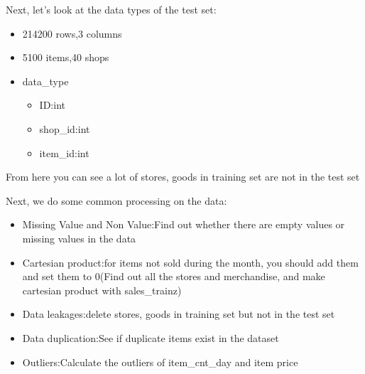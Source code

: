 \documentclass{amsart}
\begin{document}
  Next, let's look at the data types of the test set:
  \begin{itemize}
    \item 214200 rows,3 columns
    \item 5100 items,40 shops
    \item data_type
          \begin{itemize}
            \item ID:int
            \item shop_id:int
            \item item_id:int
          \end{itemize}
  \end{itemize}
  From here you can see a lot of stores, goods in training set are not in the test set\par
  Next, we do some common processing on the data:\par
  \begin{itemize}
      \item Missing Value and Non Value:Find out whether there are empty values or missing values in the data
      \item Cartesian product:for items not sold during the month, you should add them and set them to 0(Find out all the stores and merchandise, and make cartesian product with sales_trainz)
      \item Data leakages:delete stores, goods in training set but not in the test set
      \item Data duplication:See if duplicate items exist in the dataset
      \item Outliers:Calculate the outliers of item_cnt_day and item price
  \end{itemize}
\end{document}
